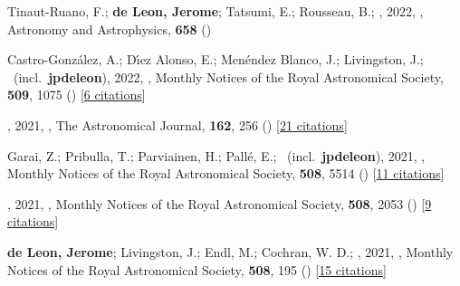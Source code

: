 \item[{\color{numcolor}\scriptsize49}] Tinaut-Ruano, F.; \textbf{de Leon, Jerome}; Tatsumi, E.; Rousseau, B.; \etal, 2022, , Astronomy and Astrophysics, \textbf{658} ()

\item[{\color{numcolor}\scriptsize48}] Castro-Gonz{\'a}lez, A.; D{\'\i}ez Alonso, E.; Men{\'e}ndez Blanco, J.; Livingston, J.; \etal\ (incl.\ \textbf{jpdeleon}), 2022, , Monthly Notices of the Royal Astronomical Society, \textbf{509}, 1075 () [\href{https://ui.adsabs.harvard.edu/abs/2022MNRAS.509.1075C}{6 citations}]

\item[{\color{numcolor}\scriptsize47}] , 2021, , The Astronomical Journal, \textbf{162}, 256 () [\href{https://ui.adsabs.harvard.edu/abs/2021AJ....162..256W}{21 citations}]

\item[{\color{numcolor}\scriptsize46}] Garai, Z.; Pribulla, T.; Parviainen, H.; Pall{\'e}, E.; \etal\ (incl.\ \textbf{jpdeleon}), 2021, , Monthly Notices of the Royal Astronomical Society, \textbf{508}, 5514 () [\href{https://ui.adsabs.harvard.edu/abs/2021MNRAS.508.5514G}{11 citations}]

\item[{\color{numcolor}\scriptsize45}] , 2021, , Monthly Notices of the Royal Astronomical Society, \textbf{508}, 2053 () [\href{https://ui.adsabs.harvard.edu/abs/2021MNRAS.508.2053T}{9 citations}]

\item[{\color{numcolor}\scriptsize44}] \textbf{de Leon, Jerome}; Livingston, J.; Endl, M.; Cochran, W. D.; \etal, 2021, , Monthly Notices of the Royal Astronomical Society, \textbf{508}, 195 () [\href{https://ui.adsabs.harvard.edu/abs/2021MNRAS.508..195D}{15 citations}]

